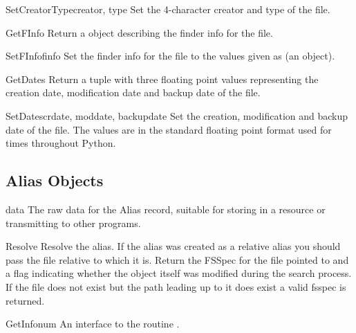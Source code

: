 \begin{methoddesc}[FSSpec]{SetCreatorType}{creator, type}
Set the 4-character creator and type of the file.
\end{methoddesc}

\begin{methoddesc}[FSSpec]{GetFInfo}{}
Return a  object describing the finder info for the file.
\end{methoddesc}

\begin{methoddesc}[FSSpec]{SetFInfo}{finfo}
Set the finder info for the file to the values given as 
(an  object).
\end{methoddesc}

\begin{methoddesc}[FSSpec]{GetDates}{}
Return a tuple with three floating point values representing the
creation date, modification date and backup date of the file.
\end{methoddesc}

\begin{methoddesc}[FSSpec]{SetDates}{crdate, moddate, backupdate}
Set the creation, modification and backup date of the file. The values
are in the standard floating point format used for times throughout
Python.
\end{methoddesc}


\subsection{Alias Objects \label{alias-objects}}

\begin{memberdesc}[Alias]{data}
The raw data for the Alias record, suitable for storing in a resource
or transmitting to other programs.
\end{memberdesc}

\begin{methoddesc}[Alias]{Resolve}{}
Resolve the alias. If the alias was created as a relative alias you
should pass the file relative to which it is. Return the FSSpec for
the file pointed to and a flag indicating whether the  object
itself was modified during the search process. If the file does
not exist but the path leading up to it does exist a valid fsspec
is returned.
\end{methoddesc}

\begin{methoddesc}[Alias]{GetInfo}{num}
An interface to the \C{} routine .
\end{methoddesc}

